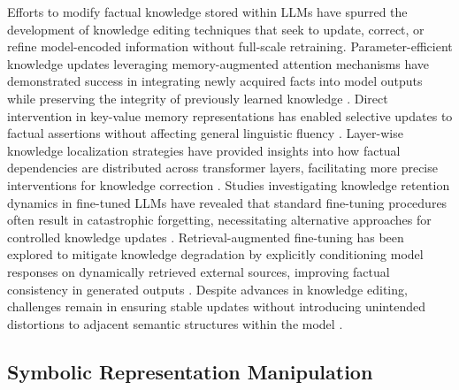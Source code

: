 \documentclass[5p,times]{elsarticle}
\begin{document}
Efforts to modify factual knowledge stored within LLMs have spurred the development of knowledge editing techniques that seek to update, correct, or refine model-encoded information without full-scale retraining. Parameter-efficient knowledge updates leveraging memory-augmented attention mechanisms have demonstrated success in integrating newly acquired facts into model outputs while preserving the integrity of previously learned knowledge \cite{ zollner2024technical}. Direct intervention in key-value memory representations has enabled selective updates to factual assertions without affecting general linguistic fluency \cite{barbere2024dynamic}. Layer-wise knowledge localization strategies have provided insights into how factual dependencies are distributed across transformer layers, facilitating more precise interventions for knowledge correction \cite{fa2024modality}. Studies investigating knowledge retention dynamics in fine-tuned LLMs have revealed that standard fine-tuning procedures often result in catastrophic forgetting, necessitating alternative approaches for controlled knowledge updates \cite{zahmad2024probabilistic}. Retrieval-augmented fine-tuning has been explored to mitigate knowledge degradation by explicitly conditioning model responses on dynamically retrieved external sources, improving factual consistency in generated outputs \cite{ono2024evaluating}. Despite advances in knowledge editing, challenges remain in ensuring stable updates without introducing unintended distortions to adjacent semantic structures within the model \cite{beard2024adaptive}.

\subsection{Symbolic Representation Manipulation}
\end{document}
